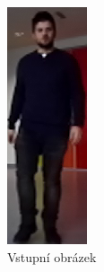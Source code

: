 \begin{figure}[H]
\centering
\begin{minipage}{.3\textwidth}
  \centering
  \includegraphics[width=.5\linewidth]{figures/hog_input}
  \caption*{Vstupní obrázek}
  \label{fig:hog_input}
\end{minipage}%
\begin{minipage}{.3\textwidth}
  \centering

\end{minipage}
\end{figure}
